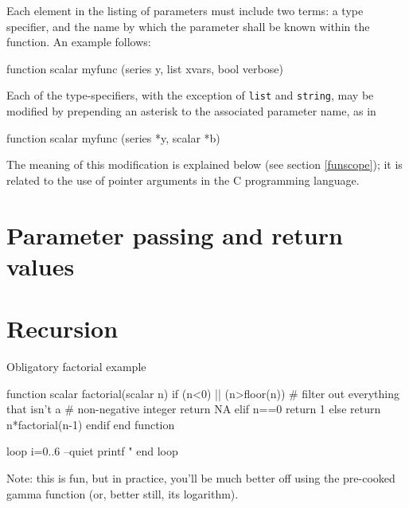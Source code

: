 Each element in the listing of parameters must include two terms: a
type specifier, and the name by which the parameter shall be known
within the function.  An example follows:
%    
\begin{code}
function scalar myfunc (series y, list xvars, bool verbose)
\end{code}

Each of the type-specifiers, with the exception of \texttt{list} and
\texttt{string}, may be modified by prepending an asterisk to the
associated parameter name, as in
%    
\begin{code}
function scalar myfunc (series *y, scalar *b)
\end{code}

The meaning of this modification is explained below (see section
\ref{funscope}); it is related to the use of pointer arguments in the
C programming language.


\section{Parameter passing and return values}
\label{sec:params-returns}



\section{Recursion}

Obligatory factorial example
\begin{code}
function scalar factorial(scalar n)
    if (n<0) || (n>floor(n))
        # filter out everything that isn't a 
        # non-negative integer
        return NA
    elif n==0
        return 1
    else
        return n*factorial(n-1)
    endif
end function

loop i=0..6 --quiet
    printf "%
end loop
\end{code}

Note: this is fun, but in practice, you'll be much better off using
the pre-cooked gamma function (or, better still, its logarithm).

